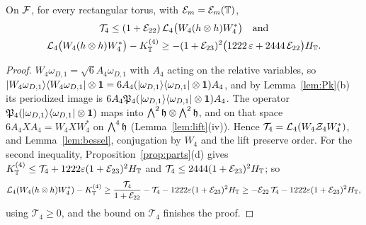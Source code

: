 \begin{proposition}\label{prop:four}
On $\mathcal{F}$, for every rectangular torus, with $\mathcal{E}_m=\mathcal{E}_m(\mathbb{T})$,
\begin{gather*}
\mathcal T_4\le(1+\mathcal{E}_{22})\,\mathcal{L}_4\bigl(W_4(h\otimes h)W_4^*\bigr)\quad\text{and}\\
\mathcal{L}_4\bigl(W_4(h\otimes h)W_4^*\bigr)-K_{\mathbb{T}}^{(4)}\ge-(1+\mathcal{E}_{23})^2\bigl(1222\,\varepsilon+2444\,\mathcal{E}_{22}\bigr)H_{\mathbb{T}} .
\end{gather*}
\end{proposition}

\begin{proof}
$W_4\omega_{D,1}=\sqrt6A_4\omega_{D,1}$ with $A_4$ acting on the relative variables, so
$\lvert W_4\omega_{D,1}\rangle\langle W_4\omega_{D,1}\rvert\otimes\mathbf{1}=6A_4(\lvert \omega_{D,1}\rangle\langle \omega_{D,1}\rvert\otimes\mathbf{1})A_4$, and by Lemma~\ref{lem:Pk}(b) its periodized
image is $6A_4\mathfrak{P}_4(\lvert \omega_{D,1}\rangle\langle \omega_{D,1}\rvert\otimes\mathbf{1})A_4$. The operator $\mathfrak{P}_4(\lvert \omega_{D,1}\rangle\langle \omega_{D,1}\rvert\otimes\mathbf{1})$ maps into
$\bigwedge^2\mathfrak{h}\otimes\bigwedge^2\mathfrak{h}$, and on that space $6A_4XA_4=W_4XW_4^*$ on $\bigwedge^4\mathfrak{h}$ (Lemma~\ref{lem:lift}(iv)). Hence
$\mathcal T_4=\mathcal{L}_4(W_4\mathcal Z_4W_4^*)$, and Lemma~\ref{lem:bessel}, conjugation by $W_4$ and the lift preserve order. For the second
inequality, Proposition~\ref{prop:parts}(d) gives $K_{\mathbb{T}}^{(4)}\le\mathcal T_4+1222\varepsilon(1+\mathcal{E}_{23})^2H_{\mathbb{T}}$ and $\mathcal T_4\le2444(1+\mathcal{E}_{23})^2H_{\mathbb{T}}$; so
\[
\mathcal{L}_4(W_4(h\otimes h)W_4^*)-K_{\mathbb{T}}^{(4)}\ge\frac{\mathcal T_4}{1+\mathcal{E}_{22}}-\mathcal T_4-1222\varepsilon(1+\mathcal{E}_{23})^2H_{\mathbb{T}}\ge-\mathcal{E}_{22}\,\mathcal T_4-1222\varepsilon(1+\mathcal{E}_{23})^2H_{\mathbb{T}},
\]
using $\mathcal T_4\ge0$, and the bound on $\mathcal T_4$ finishes the proof.
\end{proof}

